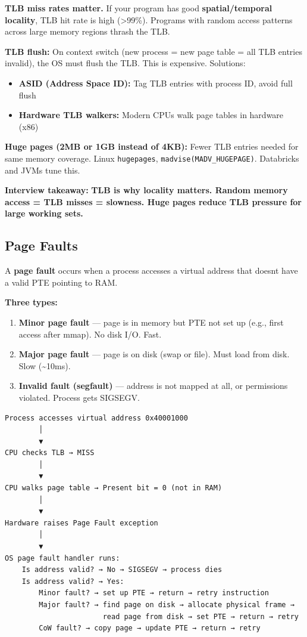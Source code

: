 \documentclass[11pt]{article}
\providecommand{\tightlist}{\setlength{\itemsep}{1pt}\setlength{\parskip}{0pt}}
\begin{document}
\textbf{TLB miss rates matter.} If your program has good \textbf{spatial/temporal locality}, TLB hit rate is high (\textgreater99\%). Programs with random access patterns across large memory regions thrash the TLB.

\textbf{TLB flush:} On context switch (new process = new page table = all TLB entries invalid), the OS must flush the TLB. This is expensive. Solutions:

\begin{itemize}
\tightlist
\item
  \textbf{ASID (Address Space ID):} Tag TLB entries with process ID, avoid full flush
\item
  \textbf{Hardware TLB walkers:} Modern CPUs walk page tables in hardware (x86)
\end{itemize}

\textbf{Huge pages (2MB or 1GB instead of 4KB):} Fewer TLB entries needed for same memory coverage. Linux \texttt{hugepages}, \texttt{madvise(MADV\_HUGEPAGE)}. Databricks and JVMs tune this.

\textbf{Interview takeaway:} \textbf{TLB is why locality matters. Random memory access = TLB misses = slowness. Huge pages reduce TLB pressure for large working sets.}

\subsection{Page Faults}\label{page-faults}

A \textbf{page fault} occurs when a process accesses a virtual address that doesn\textquotesingle t have a valid PTE pointing to RAM.

\textbf{Three types:}

\begin{enumerate}
\def\labelenumi{\arabic{enumi}.}
\tightlist
\item
  \textbf{Minor page fault} --- page is in memory but PTE not set up (e.g., first access after mmap). No disk I/O. Fast.
\item
  \textbf{Major page fault} --- page is on disk (swap or file). Must load from disk. Slow (\textasciitilde10ms).
\item
  \textbf{Invalid fault (segfault)} --- address is not mapped at all, or permissions violated. Process gets SIGSEGV.
\end{enumerate}

\setcodelang{}

\begin{verbatim}
Process accesses virtual address 0x40001000
        │
        ▼
CPU checks TLB → MISS
        │
        ▼
CPU walks page table → Present bit = 0 (not in RAM)
        │
        ▼
Hardware raises Page Fault exception
        │
        ▼
OS page fault handler runs:
    Is address valid? → No → SIGSEGV → process dies
    Is address valid? → Yes:
        Minor fault? → set up PTE → return → retry instruction
        Major fault? → find page on disk → allocate physical frame →
                       read page from disk → set PTE → return → retry
        CoW fault? → copy page → update PTE → return → retry
\end{verbatim}
\end{document}

